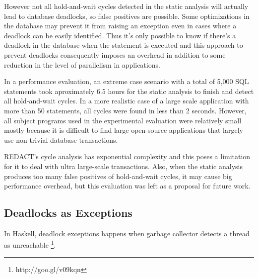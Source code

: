 However not all hold-and-wait cycles detected in the static analysis will actually lead to database deadlocks, so false positives are possible.
Some optimizations in the database may prevent it from raising an exception even in cases where a deadlock can be easily identified.
Thus it's only possible to know if there's a deadlock in the database when the statement is executed and this approach to prevent deadlocks
consequently imposes an overhead in addition to some reduction in the level of parallelism in applications.

In a performance evaluation, an extreme case scenario with a total of 5,000 SQL statements took aproximately 6.5 hours for the static analysis to finish and detect all hold-and-wait
cycles. In a more realistic case of a large scale application with more than 50 statements, all cycles were found in less than 2 seconds. However, all subject programs used in the
experimental evaluation were relatively small mostly because it is difficult to find large open-source applications that largely use non-trivial database transactions.

REDACT's cycle analysis has exponential complexity and this poses a limitation for it to deal with ultra large-scale transactions. Also, when the static analysis
produces too many false positives of hold-and-wait cycles, it may cause big performance overhead, but this evaluation was left as a proposal for future work.

\subsection{Deadlocks as Exceptions}

In Haskell, deadlock exceptions happens when garbage collector detects a thread as unreachable \footnote{http://goo.gl/v09kqn}.
